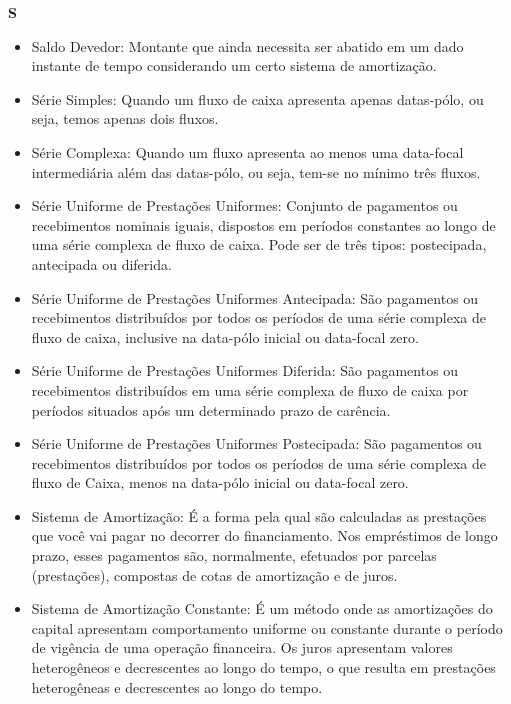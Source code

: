 \textbf{S}
\begin{itemize}
 \item Saldo Devedor:
    Montante que ainda necessita ser abatido em um dado instante de tempo considerando um certo sistema de amortização. 

\item Série Simples:
    Quando um fluxo de caixa apresenta apenas datas-pólo, ou seja, temos apenas dois fluxos. 

\item Série Complexa:
    Quando um fluxo apresenta ao menos uma data-focal intermediária além das datas-pólo, ou seja, tem-se no mínimo três fluxos. 

\item Série Uniforme de Prestações Uniformes:
    Conjunto de pagamentos ou recebimentos nominais iguais, dispostos em períodos constantes ao longo de uma série complexa de fluxo de caixa. Pode ser de três tipos: postecipada, antecipada ou diferida. 

\item Série Uniforme de Prestações Uniformes Antecipada:
    São pagamentos ou recebimentos distribuídos por todos os períodos de uma série complexa de fluxo de caixa, inclusive na data-pólo inicial ou data-focal zero. 

\item Série Uniforme de Prestações Uniformes Diferida:
    São pagamentos ou recebimentos distribuídos em uma série complexa de fluxo de caixa por períodos situados após um determinado prazo de carência. 

\item Série Uniforme de Prestações Uniformes Postecipada:
    São pagamentos ou recebimentos distribuídos por todos os períodos de uma série complexa de fluxo de Caixa, menos na data-pólo inicial ou data-focal zero. 

\item Sistema de Amortização:
    É a forma pela qual são calculadas as prestações que você vai pagar no decorrer do financiamento. Nos empréstimos de longo prazo, esses pagamentos são, normalmente, efetuados por parcelas (prestações), compostas de cotas de amortização e de juros. 

\item Sistema de Amortização Constante:
    É um método onde as amortizações do capital apresentam comportamento uniforme ou constante durante o período de vigência de uma operação financeira. Os juros apresentam valores heterogêneos e decrescentes ao longo do tempo, o que resulta em prestações heterogêneas e decrescentes ao longo do tempo. 


\end{itemize}
